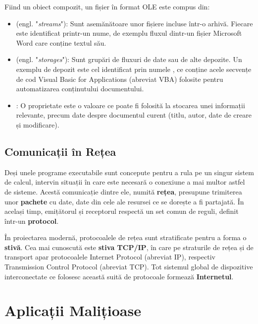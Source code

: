 \documentclass[../../main.tex]{subfiles}
\begin{document}
Fiind un obiect compozit, un fișier în format OLE este compus din:

\begin{itemize}
    \item {} (engl. "\textit{streams}"): Sunt asemănătoare unor fișiere incluse într-o arhivă. Fiecare este identificat printr-un nume, de exemplu fluxul  dintr-un fișier Microsoft Word care conține textul său.
    \item {} (engl. "\textit{storages}"): Sunt grupări de fluxuri de date sau de alte depozite. Un exemplu de depozit este cel identificat prin numele , ce conține acele secvențe de cod Visual Basic for Applications (abreviat VBA) folosite pentru automatizarea conținutului documentului.
    \item {}: O proprietate este o valoare ce poate fi folosită la stocarea unei informații relevante, precum date despre documentul curent (titlu, autor, date de creare și modificare).
\end{itemize}

\subsection{Comunicații în Rețea}

Deși unele programe executabile sunt concepute pentru a rula pe un singur sistem de calcul, intervin situații în care este necesară o conexiune a mai multor astfel de sisteme. Acestă comunicație dintre ele, numită \textbf{rețea}, presupune trimiterea unor \textbf{pachete} cu date, date din cele ale resursei ce se dorește a fi partajată. În același timp, emițătorul și receptorul respectă un set comun de reguli, definit într-un \textbf{protocol}.

În proiectarea modernă, protocoalele de rețea sunt stratificate pentru a forma o \textbf{stivă}. Cea mai cunoscută este \textbf{stiva TCP/IP}, în care pe straturile de rețea și de transport apar protocoalele Internet Protocol (abreviat IP), respectiv Transmission Control Protocol (abreviat TCP). Tot sistemul global de dispozitive interconectate ce folosesc această suită de protocoale formează \textbf{Internetul}.

\section{Aplicații Malițioase}
\label{sec:theory_malware}
\end{document}
